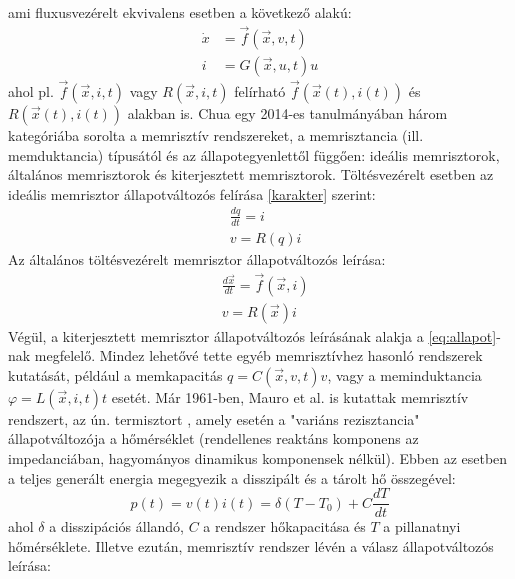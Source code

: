 \documentclass[twoside]{article}
\begin{document}
ami fluxusvezérelt ekvivalens esetben a következő alakú:
\begin{equation}
	\begin{aligned}
		\dot{x} &= \vec{f}(\vec{x}, v, t) \\
		i &= G(\vec{x}, u, t)u
	\end{aligned}
\end{equation}
ahol pl. $\vec{f}(\vec{x}, i, t)$ vagy $R(\vec{x}, i, t)$ felírható $\vec{f}(\vec{x}(t), i(t))$ és $R(\vec{x}(t), i(t))$ alakban is. Chua egy 2014-es tanulmányában három kategóriába sorolta a memrisztív rendszereket, a memrisztancia (ill. memduktancia) típusától és az állapotegyenlettől függően: ideális memrisztorok, általános memrisztorok és kiterjesztett memrisztorok\cite{chua2014}. Töltésvezérelt esetben az ideális memrisztor állapotváltozós felírása \eqref{karakter} szerint:
\begin{equation}
	\begin{aligned}
		&\frac{dq}{dt} = i \\
		&v = R(q)i
	\end{aligned}
\end{equation}
Az általános töltésvezérelt memrisztor állapotváltozós leírása:
\begin{equation}
	\begin{aligned}
		&\frac{d\vec{x}}{dt} = \vec{f}(\vec{x}, i) \\
		&v = R(\vec{x})i
	\end{aligned}
	\label{eq:altalanos}
\end{equation}
Végül, a kiterjesztett memrisztor állapotváltozós leírásának alakja a \eqref{eq:allapot}-nak megfelelő.
Mindez lehetővé tette egyéb memrisztívhez hasonló rendszerek kutatását, például a memkapacitás $q = C(\vec{x}, v, t)v$, vagy a meminduktancia $\varphi = L(\vec{x}, i, t)t$ esetét. Már 1961-ben, Mauro et al. is kutattak memrisztív rendszert, az ún. termisztort \cite{mauro1961}\cite{chuakang1976}\cite{tellini2021}, amely esetén a "variáns rezisztancia" állapotváltozója a hőmérséklet (rendellenes reaktáns komponens az impedanciában, hagyományos dinamikus komponensek nélkül). Ebben az esetben a teljes generált energia megegyezik a disszipált és a tárolt hő összegével:
 \begin{equation}
 	p(t) = v(t)i(t) = \delta(T-T_0) + C\frac{dT}{dt} 
 \end{equation}
 ahol $\delta$ a disszipációs állandó, $C$ a rendszer hőkapacitása és $T$ a pillanatnyi hőmérséklete. Illetve ezután, memrisztív rendszer lévén \cite{chuakang1976} a válasz állapotváltozós leírása: 
\end{document}
